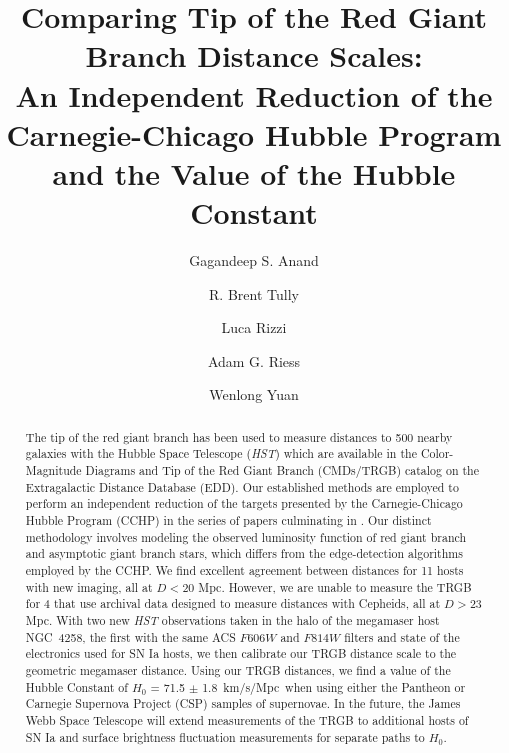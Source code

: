 \documentclass[twocolumn]{aastex62}
\newcommand{\hubblePan}{71.5 $\pm$ 1.8~km/s/Mpc}
\begin{document}
\title{\textbf{Comparing Tip of the Red Giant Branch Distance Scales: \\ An Independent Reduction of the Carnegie-Chicago Hubble Program \\ and the Value of the Hubble Constant}}

\author{Gagandeep S. Anand}

\author{R. Brent Tully}

\author{Luca Rizzi}

\author{Adam G. Riess}

\author{Wenlong Yuan}


\begin{abstract}

The tip of the red giant branch has been used to measure distances to 500 nearby galaxies with the Hubble Space Telescope (\textit{HST}) which are available in the Color-Magnitude Diagrams and Tip of the Red Giant Branch (CMDs/TRGB) catalog on the Extragalactic Distance Database (EDD). Our established methods are employed to perform an independent reduction of the targets presented by the Carnegie-Chicago Hubble Program (CCHP) in the series of papers culminating in \cite{2021arXiv210615656F}. Our distinct methodology involves modeling the observed luminosity function of red giant branch and asymptotic giant branch stars, which differs from the edge-detection algorithms employed by the CCHP. We find excellent agreement between distances for 11 hosts with new imaging, all at $D<20$ Mpc. However, we are unable to measure the TRGB for 4 that use archival data designed to measure distances with Cepheids, all at $D>23$ Mpc. With two new \textit{HST} observations taken in the halo of the megamaser host NGC~4258, the first with the same ACS $F606W$ and $F814W$ filters and state of the electronics used for SN Ia hosts, we then calibrate our TRGB distance scale to the geometric megamaser distance. Using our TRGB distances, we find a value of the Hubble Constant of $H_{0}$ = \hubblePan \ when using either the Pantheon or Carnegie Supernova Project (CSP) samples of supernovae. In the future, the James Webb Space Telescope will extend measurements of the TRGB to additional hosts of SN Ia and surface brightness fluctuation measurements for separate paths to $H_{0}$.

\end{abstract}
\end{document}
